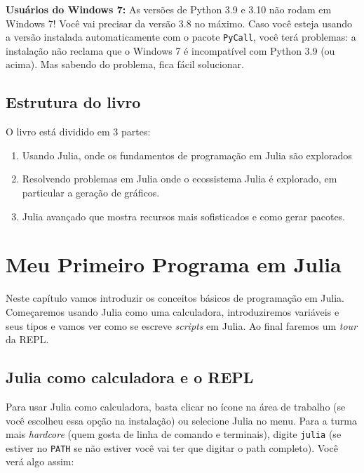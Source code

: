 \documentclass[
  notoc %
]{tufte-book}
\providecommand{\tightlist}{%
  \setlength{\itemsep}{0pt}\setlength{\parskip}{0pt}
}
\newcommand{\passthrough}[1]{#1}
\begin{document}
\textbf{Usuários do Windows 7:} As versões de Python 3.9 e 3.10 não
rodam em Windows 7! Você vai precisar da versão 3.8 no máximo. Caso você
esteja usando a versão instalada automaticamente com o pacote
\passthrough{\lstinline!PyCall!}, você terá problemas: a instalação não
reclama que o Windows 7 é incompatível com Python 3.9 (ou acima). Mas
sabendo do problema, fica fácil solucionar.

\hypertarget{estrutura-do-livro}{%
\section{Estrutura do livro}\label{estrutura-do-livro}}

O livro está dividido em 3 partes:

\begin{enumerate}
\def\labelenumi{\arabic{enumi}.}
\tightlist
\item
  Usando Julia, onde os fundamentos de programação em Julia são
  explorados
\item
  Resolvendo problemas em Julia onde o ecossistema Julia é explorado, em
  particular a geração de gráficos.
\item
  Julia avançado que mostra recursos mais sofisticados e como gerar
  pacotes.
\end{enumerate}

\hypertarget{sec:primeiro}{%
\chapter{Meu Primeiro Programa em Julia}\label{sec:primeiro}}

Neste capítulo vamos introduzir os conceitos básicos de programação em
Julia. Começaremos usando Julia como uma calculadora, introduziremos
variáveis e seus tipos e vamos ver como se escreve \emph{scripts} em
Julia. Ao final faremos um \emph{tour} da REPL.

\hypertarget{sec:pr-calculadora}{%
\section{Julia como calculadora e o REPL}\label{sec:pr-calculadora}}

Para usar Julia como calculadora, basta clicar no ícone na área de
trabalho (se você escolheu essa opção na instalação) ou selecione Julia
no menu. Para a turma mais \emph{hardcore} (quem gosta de linha de
comando e terminais), digite \passthrough{\lstinline!julia!} (se estiver
no \passthrough{\lstinline!PATH!} se não estiver você vai ter que
digitar o path completo). Você verá algo assim:
\end{document}
